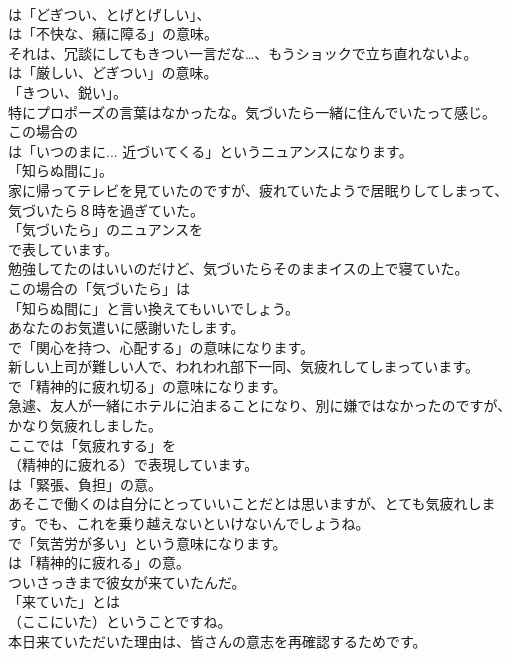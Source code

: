 \documentclass[8pt]{extreport}
\begin{document}
\begin{CJK}{UTF8}{min}
\\	は「どぎつい、とげとげしい」、
\\	は「不快な、癪に障る」の意味。	
\\	それは、冗談にしてもきつい一言だな…、もうショックで立ち直れないよ。 
\\	は「厳しい、どぎつい」の意味。
\\	「きつい、鋭い」。	
\\	特にプロポーズの言葉はなかったな。気づいたら一緒に住んでいたって感じ。 
\\	この場合の
\\	は「いつのまに... 近づいてくる」というニュアンスになります。
\\	「知らぬ間に」。	
\\	家に帰ってテレビを見ていたのですが、疲れていたようで居眠りしてしまって、気づいたら８時を過ぎていた。 
\\	「気づいたら」のニュアンスを 
\\	で表しています。	
\\	勉強してたのはいいのだけど、気づいたらそのままイスの上で寝ていた。 
\\	この場合の「気づいたら」は
\\	「知らぬ間に」と言い換えてもいいでしょう。	
\\	あなたのお気遣いに感謝いたします。 
\\	で「関心を持つ、心配する」の意味になります。	
\\	新しい上司が難しい人で、われわれ部下一同、気疲れしてしまっています。 
\\	で「精神的に疲れ切る」の意味になります。	
\\	急遽、友人が一緒にホテルに泊まることになり、別に嫌ではなかったのですが、かなり気疲れしました。 
\\	ここでは「気疲れする」を 
\\	（精神的に疲れる）で表現しています。
\\	は「緊張、負担」の意。	
\\	あそこで働くのは自分にとっていいことだとは思いますが、とても気疲れします。でも、これを乗り越えないといけないんでしょうね。 
\\	で「気苦労が多い」という意味になります。
\\	は「精神的に疲れる」の意。	
\\	ついさっきまで彼女が来ていたんだ。 
\\	「来ていた」とは 
\\	（ここにいた）ということですね。	
\\	本日来ていただいた理由は、皆さんの意志を再確認するためです。 

\end{CJK}
\end{document}
